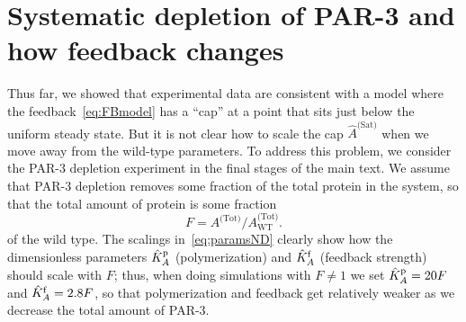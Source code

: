 \documentclass[11pt]{article}
\newcommand{\6}[1]{#1_{\text{6}}}
\newcommand{\3}[1]{#1_{\text{3}}}
\newcommand{\Tot}[1]{#1^\text{(Tot)}}
\newcommand{\Sat}[1]{#1^\text{(Sat)}}
\begin{document}
\section{Systematic depletion of PAR-3 and how feedback changes \label{sec:howFB}}
Thus far, we showed that experimental data are consistent with a model where the feedback\ \eqref{eq:FBmodel} has a ``cap'' at a point that sits just below the uniform steady state. But it is not clear how to scale the cap $\Sat{\hat A}$ when we move away from the wild-type parameters. To address this problem, we consider the PAR-3 depletion experiment in the final stages of the main text. We assume that PAR-3 depletion removes some fraction of the total protein in the system, so that the total amount of protein is some fraction
\begin{equation*}
F=\Tot{A}/\Tot{A}_\text{WT}.
\end{equation*}
of the wild type. The scalings in\ \eqref{eq:paramsND} clearly show how the dimensionless parameters $\hat{K}^\text{p}_A$ (polymerization) and $\hat{K}^\text{f}_A$ (feedback strength) should scale with $F$; thus, when doing simulations with $F \neq 1$ we set $\hat{K}^\text{p}_A=20F$ and $\hat{K}^\text{f}_A=2.8F$, so that polymerization and feedback get relatively weaker as we decrease the total amount of PAR-3. 
\end{document}

